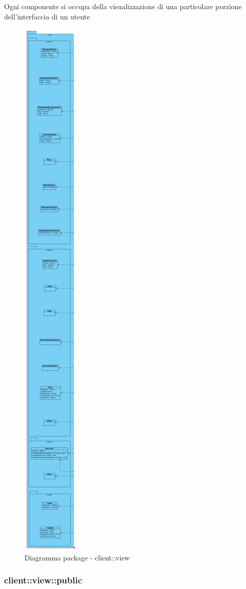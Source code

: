 Ogni componente si occupa della visualizzazione di una particolare porzione dell'interfaccia di un utente\begin{center}
		\begin{figure}[H]
			\centering \includegraphics[scale=4, max width=\textwidth, max height=\myheight]{../img/diagrammiClassi/client/view.png}
			\caption{Diagramma package - client::view}
		\end{figure}
	\end{center}\subsubsection{client::view::public}
